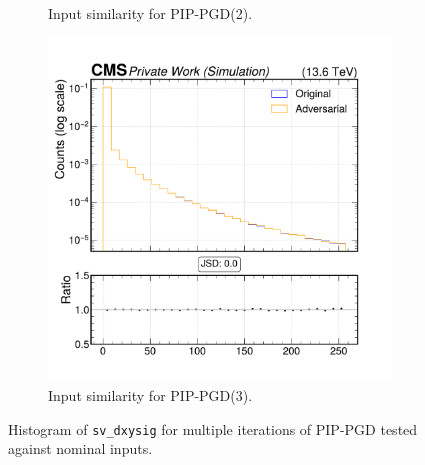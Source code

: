 \begin{figure}[htbp]
\begin{subfigure}[t]{0.32\textwidth}
    \caption*{Input similarity for PIP-PGD(2).}
  \end{subfigure}\hfill
  \begin{subfigure}[t]{0.32\textwidth}
    \includegraphics[width=\linewidth]{media/output/features/compare/combined_it_3/cmp_vtx_arr_sv_dxysig.pdf}
    \caption*{Input similarity for PIP-PGD(3).}
  \end{subfigure}

  \caption*{Histogram of \texttt{sv\_dxysig} for multiple iterations of PIP-PGD tested against nominal inputs.}
  \label{fig:combined_input_sv_dxysig}
\end{figure}

